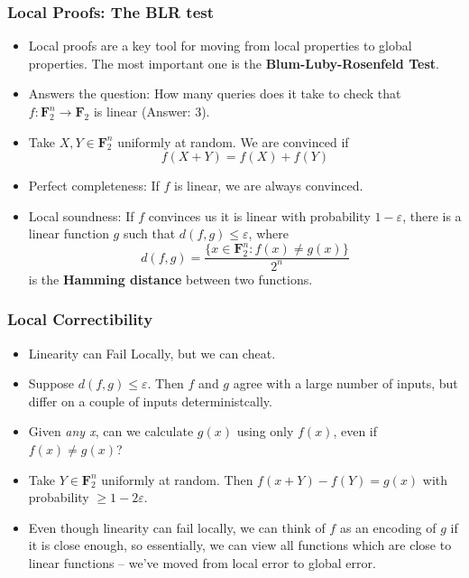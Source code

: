 \documentclass{beamer}
\begin{document}
\begin{frame}
    \frametitle{Local Proofs: The BLR test}

    \begin{itemize}
        \item Local proofs are a key tool for moving from local properties to global properties. The most important one is the {\bf Blum-Luby-Rosenfeld Test}.

        \item Answers the question: How many queries does it take to check that $f: \mathbf{F}_2^n \to \mathbf{F}_2$ is linear (Answer: 3).

        \item Take $X,Y \in \mathbf{F}_2^n$ uniformly at random. We are convinced if
        \[ f(X + Y) = f(X) + f(Y) \]

        \item Perfect completeness: If $f$ is linear, we are always convinced.
        \item Local soundness: If $f$ convinces us it is linear with probability $1 - \varepsilon$, there is a linear function $g$ such that $d(f,g) \leq \varepsilon$, where
        \[ d(f,g) = \frac{\{ x \in \mathbf{F}_2^n: f(x) \neq g(x) \}}{2^n} \]
        is the {\bf Hamming distance} between two functions.
    \end{itemize}
\end{frame}

\begin{frame}
    \frametitle{Local Correctibility}

    \begin{itemize}
        \item Linearity can Fail Locally, but we can cheat.

        \item Suppose $d(f,g) \leq \varepsilon$. Then $f$ and $g$ agree with a large number of inputs, but differ on a couple of inputs deterministcally.

        \item Given {\it any x}, can we calculate $g(x)$ using only $f(x)$, even if $f(x) \neq g(x)$?

        \item Take $Y \in \mathbf{F}_2^n$ uniformly at random. Then $f(x + Y) - f(Y) = g(x
        )$ with probability $\geq 1 - 2 \varepsilon$.

        \item Even though linearity can fail locally, we can think of $f$ as an encoding of $g$ if it is close enough, so essentially, we can view all functions which are close to linear functions -- we've moved from local error to global error.
    \end{itemize}
\end{frame}
\end{document}
